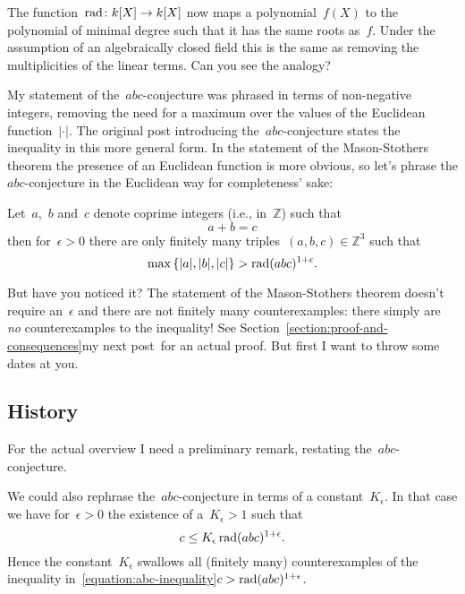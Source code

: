 The function~$\operatorname{rad}\colon k[X]\to k[X]$ now maps a polynomial~$f(X)$ to the polynomial of minimal degree such that it has the same roots as~$f$. Under the assumption of an algebraically closed field this is the same as removing the multiplicities of the linear terms. Can you see the analogy?

\begin{remark}
  My statement of the~$abc$\nobreakdash-conjecture was phrased in terms of non-negative integers, removing the need for a maximum over the values of the Euclidean function~$|\cdot|$. The original post introducing the~$abc$\nobreakdash-conjecture states the inequality in this more general form. In the statement of the Mason-Stothers theorem the presence of an Euclidean function is more obvious, so let's phrase the $abc$-conjecture in the Euclidean way for completeness' sake:
\end{remark}

\begin{conjecture}
  Let~$a$,~$b$ and~$c$ denote coprime integers (i.e., in~$\mathbb{Z}$) such that
  \begin{equation}
    a+b=c
  \end{equation}
  then for~$\epsilon>0$ there are only finitely many triples~$(a,b,c)\in\mathbb{Z}^3$ such that
  \begin{equation}
    \max\left\{ |a|,|b|,|c| \right\}>\operatorname{rad}(abc)^{1+\epsilon}.
  \end{equation}
\end{conjecture}

But have you noticed it? The statement of the Mason-Stothers theorem doesn't require an~$\epsilon$ and there are not finitely many counterexamples: there simply are \emph{no} counterexamples to the inequality! See \iftex Section~\ref{section:proof-and-consequences}\fi\ifblog my next post\fi~for an actual proof. But first I want to throw some dates at you.

\subsection{History}

For the actual overview I need a preliminary remark, restating the~$abc$\nobreakdash-conjecture.
\begin{remark}
  \label{remark:abc-with-factor}
  We could also rephrase the~$abc$\nobreakdash-conjecture in terms of a constant~$K_{\epsilon}$. In that case we have for~$\epsilon>0$ the existence of a~$K_{\epsilon}>1$ such that
  \begin{equation}
    c\leq K_{\epsilon}\operatorname{rad}(abc)^{1+\epsilon}.
  \end{equation}
  Hence the constant~$K_{\epsilon}$ swallows all (finitely many) counterexamples of the inequality \iftex in~\eqref{equation:abc-inequality}\fi\ifblog$c>\operatorname{rad}(abc)^{1+\epsilon}$\fi.
\end{remark}

